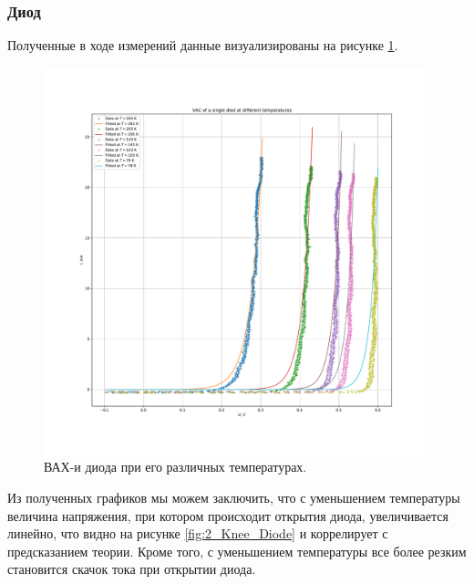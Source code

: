 \documentclass[a4paper, 12pt]{article}
\begin{document}
\subsubsection{Диод}

Полученные в ходе измерений данные визуализированы на рисунке \ref{fig:2_Diode}.

\begin{figure}[H]
	\centering
	\includegraphics[width=\linewidth]{2_Diode}
	\caption{ВАХ-и диода при его различных температурах.}
	\label{fig:2_Diode}
\end{figure}

Из полученных графиков мы можем заключить, что с уменьшением температуры величина напряжения, при котором происходит открытия диода, увеличивается линейно, что видно на рисунке \ref{fig:2_Knee_Diode} и коррелирует с предсказанием теории. Кроме того, с уменьшением температуры все более резким становится скачок тока при открытии диода.
\end{document}
